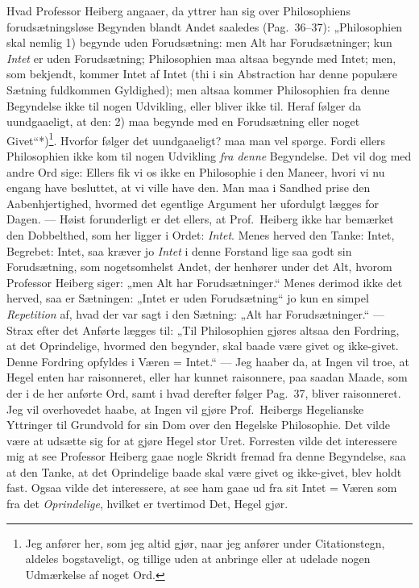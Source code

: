 \documentclass[12pt,a4paper]{book}
\newcommand{\apage}[1]{\marginnote{\footnotesize\textit{[#1]}}}
\begin{document}
Hvad Professor Heiberg angaaer, da yttrer han sig over Philosophiens
forudsætningsløse Begynden blandt Andet saaledes (Pag.\ 36--37):
„Philosophien skal nemlig 1) begynde uden Forudsætning: men Alt har
Forudsætninger; kun \emph{Intet} er uden Forudsætning; Philosophien maa altsaa
begynde med Intet; men, som bekjendt, kommer Intet af Intet (thi i sin
Abstraction har denne populære Sætning fuldkommen Gyldighed); men
altsaa kommer Philosophien fra denne Begyndelse ikke til nogen
Udvikling, eller bliver ikke til. Heraf følger da uundgaaeligt, at den:
2) maa begynde med en Forudsætning eller noget Givet“*)\footnote{Jeg
anfører her, som jeg altid gjør, naar jeg anfører under Citationstegn,
aldeles bogstaveligt, og tillige uden at anbringe eller at udelade
nogen Udmærkelse af noget Ord.}. Hvorfor følger det uundgaaeligt? maa
man vel spørge. Fordi ellers Philosophien ikke kom til nogen Udvikling
\emph{fra denne} Begyndelse. Det vil dog med andre Ord sige: Ellers fik vi os
ikke en Philosophie i den Maneer, hvori vi nu engang have besluttet, at
vi ville have den. Man maa i Sandhed prise den Aabenhjertighed, hvormed
det egentlige Argument her ufordulgt lægges for Dagen. --- Høist
forunderligt er det ellers, at Prof.\ Heiberg ikke har bemærket den
Dobbelthed, som her ligger i Ordet: \emph{Intet}. Menes herved den Tanke:
Intet, Begrebet: Intet, saa kræver jo \emph{Intet} i denne Forstand lige saa
godt sin Forudsætning, som nogetsomhelst Andet, der henhører under det
Alt, hvorom Professor Heiberg siger: „men Alt har Forudsætninger.“
Menes derimod ikke det herved, saa er Sætningen: „Intet er uden
Forudsætning“ jo kun en simpel \emph{Repetition} af, hvad der \apage{53} var sagt i den
Sætning: „Alt har Forudsætninger.“ --- Strax efter det Anførte lægges
til: „Til Philosophien gjøres altsaa den Fordring, at det Oprindelige,
hvormed den begynder, skal baade være givet og ikke-givet. Denne
Fordring opfyldes i Væren = Intet.“ --- Jeg haaber da, at Ingen vil
troe, at Hegel enten har raisonneret, eller har kunnet raisonnere, paa
saadan Maade, som der i de her anførte Ord, samt i hvad derefter følger
Pag.\ 37, bliver raisonneret. Jeg vil overhovedet haabe, at Ingen vil
gjøre Prof.\ Heibergs Hegelianske Yttringer til Grundvold for sin Dom
over den Hegelske Philosophie. Det vilde være at udsætte sig for at
gjøre Hegel stor Uret. Forresten vilde det interessere mig at see
Professor Heiberg gaae nogle Skridt fremad fra denne Begyndelse, saa at
den Tanke, at det Oprindelige baade skal være givet og ikke-givet, blev
holdt fast. Ogsaa vilde det interessere, at see ham gaae ud fra sit
Intet = Væren som fra det \emph{Oprindelige}, hvilket er tvertimod Det, Hegel
gjør.
\end{document}
